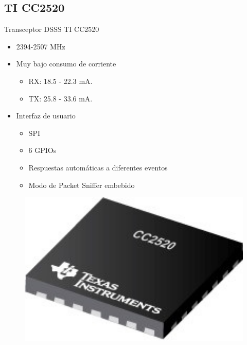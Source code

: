 \documentclass[aspectratio=169, handout]{beamer}
\begin{document}
\subsection[TI CC2520]{TI CC2520}
\begin{frame}{Transceptor DSSS TI CC2520} 
\begin{minipage}[c]{1.0\linewidth}
	\begin{minipage}[c]{0.7\linewidth}
		\begin{itemize}
			\vspace{5px}
			\item 2394-2507 MHz	
			\vspace{10px}
			\item Muy bajo consumo de corriente
			\begin{itemize}
				\item RX: 18.5 - 22.3 mA.
				\item TX: 25.8 - 33.6 mA.
			\end{itemize}
			\vspace{10px}
			\item Interfaz de usuario
			\begin{itemize}
				\item SPI
				\item 6 GPIOs
				\item Respuestas automáticas a diferentes eventos
				\item Modo de Packet Sniffer embebido
			\end{itemize}
			\vspace{10px}
		\end{itemize}
	\end{minipage}
	\begin{minipage}[c]{0.25\linewidth}
		\begin{figure}[H]
			\includegraphics[width=1\textwidth]{./imagenes/cc2520.jpg}
			\label{cc2520}
		\end{figure}	  	  	
	\end{minipage}
\end{minipage}
\end{frame}
\end{document}
